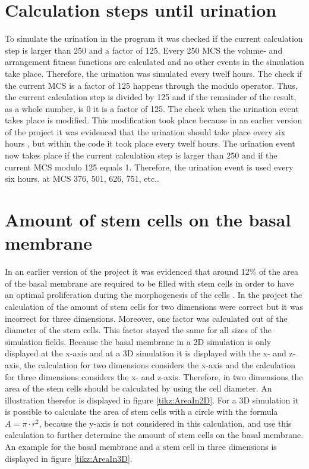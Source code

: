 \section{Calculation steps until urination}\label{sec:calculationStpesUntilUrination}
To simulate the urination in the program it was checked if the current calculation step is larger than 250 and a factor of 125. Every 250 \ac{MCS} the volume- and arrangement fitness functions are calculated and no other events in the simulation take place. Therefore, the urination was simulated every twelf hours. The check if the current \ac{MCS} is a factor of 125 happens through the modulo operator. Thus, the current calculation step is divided by 125 and if the remainder of the result, as a whole number, is 0 it is a factor of 125. \newline
The check when the urination event takes place is modified. This modification took place because in an earlier version of the project it was evidenced that the urination should take place every six hours \cite{Torelli2017}, but within the code it took place every twelf hours. The urination event now takes place if the current calculation step is larger than 250 and if the current \ac{MCS} modulo 125 equals 1. Therefore, the urination event is used every six hours, at \ac{MCS} 376, 501, 626, 751, etc.. 

\section{Amount of stem cells on the basal membrane}\label{sec:AmountStemCellsBasalMembrane}
In an earlier version of the project it was evidenced that around 12\% of the area of the basal membrane are required to be filled with stem cells in order to have an optimal proliferation during the morphogenesis of the cells \cite{Torelli2017}.
In the project the calculation of the amount of stem cells for two dimensions were correct but it was incorrect for three dimensions. Moreover, one factor was calculated out of the diameter of the stem cells. This factor stayed the same for all sizes of the simulation fields. \newline
Because the basal membrane in a 2D simulation is only displayed at the x-axis and at a 3D simulation it is displayed with the x- and z-axis, the calculation for two dimensions considers the x-axis and the calculation for three dimensions considers the x- and z-axis. Therefore, in two dimensions the area of the stem cells should be calculated by using the cell diameter. An illustration therefor is displayed in figure \ref{tikz:AreaIn2D}. For a 3D simulation it is possible to calculate the area of stem cells with a circle with the formula $A = \pi \cdot r^{2}$, because the y-axis is not considered in this calculation, and use this calculation to further determine the amount of stem cells on the basal membrane. An example for the basal membrane and a stem cell in three dimensions is displayed in figure \ref{tikz:AreaIn3D}. 

